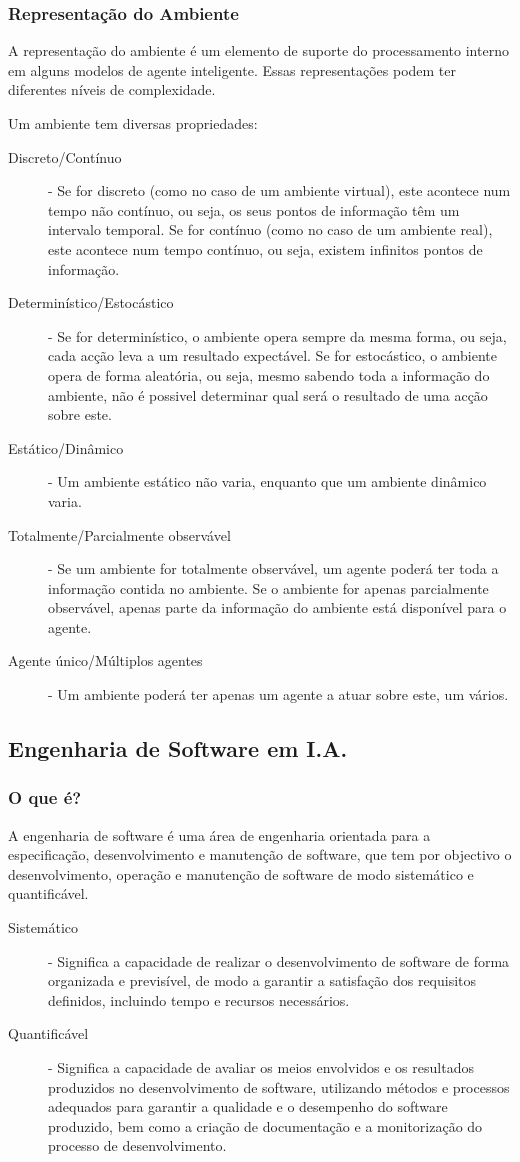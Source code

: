 \documentclass[a4paper,12pt]{article}
\begin{document}
\subsubsection{Representação do Ambiente}
A representação do ambiente é um elemento de suporte do processamento interno em alguns modelos de agente inteligente.
Essas representações podem ter diferentes níveis de complexidade.

Um ambiente tem diversas propriedades:
\begin{description}
	\item[Discreto/Contínuo] - Se for discreto (como no caso de um ambiente virtual), este acontece num tempo não contínuo, ou seja, os seus pontos de informação têm um intervalo temporal. Se for contínuo (como no caso de um ambiente real), este acontece num tempo contínuo, ou seja, existem infinitos pontos de informação.
	\item[Determinístico/Estocástico] - Se for determinístico, o ambiente opera sempre da mesma forma, ou seja, cada acção leva a um resultado expectável. Se for estocástico, o ambiente opera de forma aleatória, ou seja, mesmo sabendo toda a informação do ambiente, não é possivel determinar qual será o resultado de uma acção sobre este.
	\item[Estático/Dinâmico] - Um ambiente estático não varia, enquanto que um ambiente dinâmico varia.
	\item[Totalmente/Parcialmente observável] - Se um ambiente for totalmente observável, um agente poderá ter toda a informação contida no ambiente. Se o ambiente for apenas parcialmente observável, apenas parte da informação do ambiente está disponível para o agente.
	\item[Agente único/Múltiplos agentes] - Um ambiente poderá ter apenas um agente a atuar sobre este, um vários.
\end{description}

\newpage
\subsection{Engenharia de Software em I.A.}
\subsubsection{O que é?}
A engenharia de software é uma área de engenharia orientada para a especificação, desenvolvimento e manutenção de software, que tem por objectivo o desenvolvimento, operação e manutenção de software de modo sistemático e quantificável.
\begin{description}
	\item[Sistemático] - Significa a capacidade de realizar o desenvolvimento de software de forma organizada e previsível, de modo a garantir a satisfação dos requisitos definidos, incluindo tempo e recursos necessários.
	\item[Quantificável] - Significa a capacidade de avaliar os meios envolvidos e os resultados produzidos no desenvolvimento de software, utilizando métodos e processos adequados para garantir a qualidade e o desempenho do software produzido, bem como a criação de documentação e a monitorização do processo de desenvolvimento.
\end{description}
\end{document}
